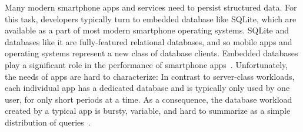 

Many modern smartphone apps and services need to persist structured data.
For this task, developers typically turn to embedded database like SQLite, which are available as a part of most modern smartphone operating systems.
SQLite and databases like it are fully-featured relational databases, and so mobile apps and operating systems represent a new class of database clients.
Embedded databases play a significant role in the performance of smartphone apps~\cite{yang-icse15}.
Unfortunately, the needs of apps are hard to characterize: In contrast to server-class workloads, each individual app has a dedicated database and is typically only used by one user, for only short periods at a time.  
As a consequence, the database workload created by a typical app is bursty, variable, and hard to summarize as a simple distribution of queries~\cite{kennedy2015pocket}.

